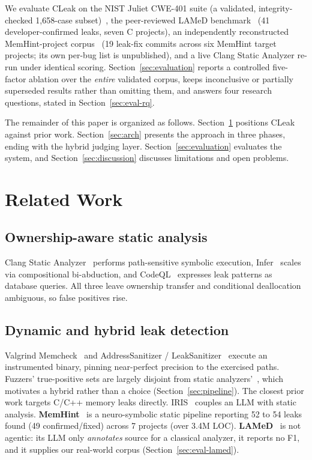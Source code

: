 \documentclass[a4paper]{llncs}
\begin{document}
We evaluate CLeak on the NIST Juliet CWE-401 suite (a validated,
integrity-checked 1{,}658-case subset)~\cite{juliet}, the peer-reviewed LAMeD
benchmark~\cite{lamed,lamed-benchmark} (41 developer-confirmed leaks, seven C projects),
an independently reconstructed MemHint-project corpus~\cite{memhint} (19
leak-fix commits across six MemHint target projects; its own per-bug
list is unpublished), and a live Clang Static Analyzer re-run under
identical scoring. Section~\ref{sec:evaluation} reports a controlled
five-factor ablation over the \emph{entire} validated corpus, keeps
inconclusive or partially superseded results rather than omitting them,
and answers four research questions, stated in
Section~\ref{sec:eval-rq}.

The remainder of this paper is organized as follows.
Section~\ref{sec:related} positions CLeak against prior work.
Section~\ref{sec:arch} presents the approach in three phases, ending
with the hybrid judging layer.
Section~\ref{sec:evaluation} evaluates the system, and Section~\ref{sec:discussion}
discusses limitations and open problems.

\section{Related Work}
\label{sec:related}

\subsection{Ownership-aware static analysis}
Clang Static Analyzer~\cite{clangsa} performs path-sensitive symbolic
execution, Infer~\cite{infer} scales via compositional bi-abduction,
and CodeQL~\cite{codeql} expresses leak patterns as database queries.
All three leave ownership transfer and conditional deallocation
ambiguous, so false positives rise.

\subsection{Dynamic and hybrid leak detection}
Valgrind Memcheck~\cite{valgrind} and
AddressSanitizer / LeakSanitizer~\cite{asan} execute an instrumented
binary, pinning near-perfect precision to the exercised paths.
Fuzzers' true-positive sets are
largely disjoint from static analyzers'~\cite{fuzzer-vs-sa}, which
motivates a hybrid rather than a choice
(Section~\ref{sec:pipeline}). The closest prior work targets C/C++
memory leaks directly. IRIS~\cite{iris} couples an LLM with static
analysis. \textbf{MemHint}~\cite{memhint} is a neuro-symbolic static
pipeline reporting 52 to 54 leaks found (49 confirmed/fixed) across 7
projects (over 3.4M LOC). \textbf{LAMeD}~\cite{lamed,lamed-benchmark}
is not agentic: its LLM only \emph{annotates} source for a classical
analyzer, it reports no F1, and it supplies our real-world corpus
(Section~\ref{sec:eval-lamed}).
\end{document}
